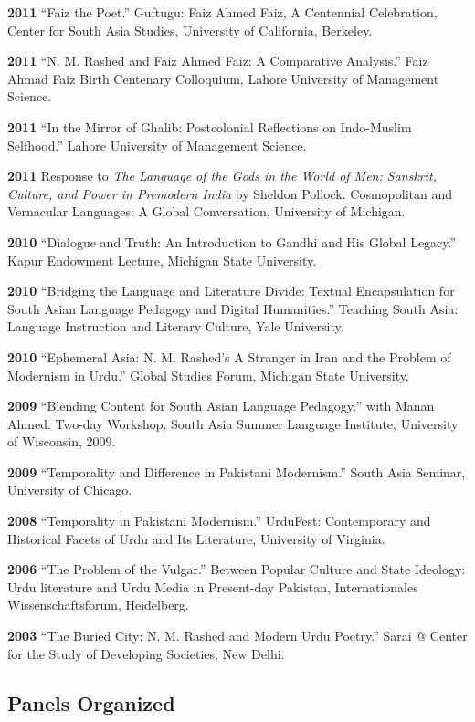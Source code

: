 \documentclass[letterpaper,12pt]{article}
\begin{document}
\textbf{2011}
“Faiz the Poet.”
Guftugu: Faiz Ahmed Faiz, A Centennial Celebration,
Center for South Asia Studies, University of California, Berkeley.

\textbf{2011}
“N. M. Rashed and Faiz Ahmed Faiz: A Comparative Analysis.”
Faiz Ahmad Faiz Birth Centenary Colloquium,
Lahore University of Management Science.

\textbf{2011}
“In the Mirror of Ghalib: Postcolonial Reflections on Indo-Muslim Selfhood.”
Lahore University of Management Science.

\textbf{2011}
Response to \emph{The Language of the Gods in the World of Men:
Sanskrit, Culture, and Power in Premodern India} by Sheldon Pollock.
Cosmopolitan and Vernacular Languages: A Global Conversation, University of Michigan.

\textbf{2010}
“Dialogue and Truth: An Introduction to Gandhi and His Global Legacy.”
Kapur Endowment Lecture, Michigan State University.

\textbf{2010}
“Bridging the Language and Literature Divide:
Textual Encapsulation for South Asian Language Pedagogy and Digital Humanities.”
Teaching South Asia: Language Instruction and Literary Culture, Yale University.

\textbf{2010}
“Ephemeral Asia:
N. M. Rashed’s A Stranger in Iran and the Problem of Modernism in Urdu.”
Global Studies Forum, Michigan State University.

\textbf{2009}
“Blending Content for South Asian Language Pedagogy,”
with Manan Ahmed.
Two-day Workshop, South Asia Summer Language Institute,
University of Wisconsin, 2009.

\textbf{2009}
“Temporality and Difference in Pakistani Modernism.”
South Asia Seminar, University of Chicago.

\textbf{2008}
“Temporality in Pakistani Modernism.”
UrduFest: Contemporary and Historical Facets of Urdu and Its Literature,
University of Virginia.

\textbf{2006}
“The Problem of the Vulgar.”
Between Popular Culture and State Ideology:
Urdu literature and Urdu Media in Present-day Pakistan,
Internationales Wissenschaftsforum, Heidelberg.

\textbf{2003}
“The Buried City: N. M. Rashed and Modern Urdu Poetry.”
Sarai @ Center for the Study of Developing Societies, New Delhi.


\subsection{Panels Organized%
  \label{panels-organized}%
}
\end{document}
